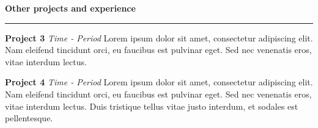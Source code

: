 \documentclass{article}[12pt]
\begin{document}
    
    \thispagestyle{plain}
    
    \huge{\textbf{Other projects and experience}}
    \vskip6pt \hrule height 0.6pt \relax 
    \vskip12pt
    
    \large \textbf{Project 3} \hfill \textit{Time - Period}
    \vskip3pt
    Lorem ipsum dolor sit amet, consectetur adipiscing elit. Nam eleifend tincidunt orci, eu faucibus est pulvinar eget. Sed nec venenatis eros, vitae interdum lectus.
    
    \vskip6pt
    
    \large \textbf{Project 4} \hfill \textit{Time - Period}
    \vskip3pt
    Lorem ipsum dolor sit amet, consectetur adipiscing elit. Nam eleifend tincidunt orci, eu faucibus est pulvinar eget. Sed nec venenatis eros, vitae interdum lectus. Duis tristique tellus vitae justo interdum, et sodales est pellentesque. 
    
    
    
    
    
    
\end{document}
